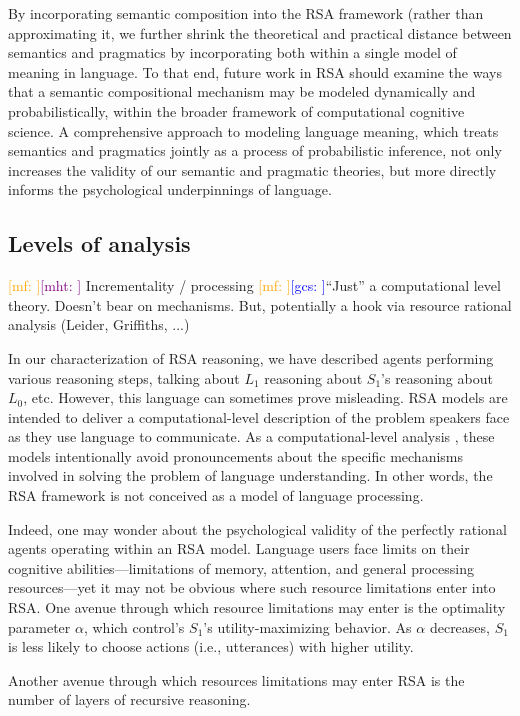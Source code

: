 \documentclass{sp}
\newcommand{\gcs}[1]{\textcolor{blue}{[gcs: #1]}}
\newcommand{\mf}[1]{\textcolor{orange}{[mf: #1]}}
\newcommand{\mht}[1]{\textcolor{purple}{[mht: #1]}}
\begin{document}
By incorporating semantic composition into the RSA framework (rather than approximating it, we further shrink the theoretical and practical distance between semantics and pragmatics by incorporating both within a single model of meaning in language. To that end, future work in RSA should examine the ways that a semantic compositional mechanism may be modeled dynamically and probabilistically, within the broader framework of computational cognitive science. A comprehensive approach to modeling language meaning, which treats semantics and pragmatics jointly as a process of probabilistic inference, not only increases the validity of our semantic and pragmatic theories, but more directly informs the psychological underpinnings of language.

\subsection{Levels of analysis}

\mf{}\mht{} Incrementality / processing
\mf{}\gcs{}``Just'' a computational level theory. Doesn't bear on mechanisms. But, potentially a hook via resource rational analysis (Leider, Griffiths, ...)

In our characterization of RSA reasoning, we have described agents performing various reasoning steps, talking about $L_1$ reasoning about $S_1$'s reasoning about $L_0$, etc. However, this language can sometimes prove misleading. RSA models are intended to deliver a computational-level description of the problem speakers face as they use language to communicate. As a computational-level analysis \citep{marr1982}, these models intentionally avoid pronouncements about the specific mechanisms involved in solving the problem of language understanding. In other words, the RSA framework is not conceived as a model of language processing.

Indeed, one may wonder about the psychological validity of the perfectly rational agents operating within an RSA model. Language users face limits on their cognitive abilities---limitations of memory, attention, and general processing resources---yet it may not be obvious where such resource limitations enter into RSA. One avenue through which resource limitations may enter is the optimality parameter $\alpha$, which control's $S_1$'s utility-maximizing behavior. As $\alpha$ decreases, $S_1$ is less likely to choose actions (i.e., utterances) with higher utility.

Another avenue through which resources limitations may enter RSA is the number of layers of recursive reasoning.
\end{document}
